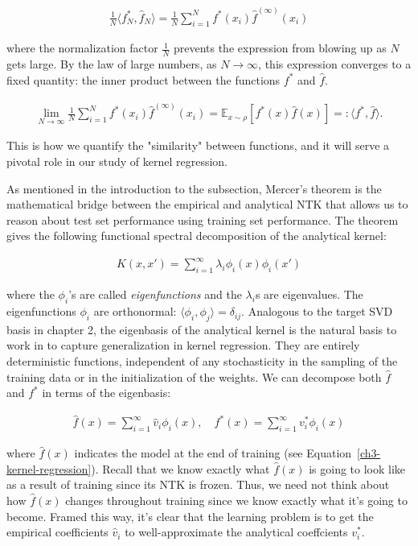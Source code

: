 \begin{align}
\frac{1}{N}\langle f^*_N,\hat{f}_N \rangle = \frac{1}{N}\sum^N_{i=1}{f^*}(x_i){\hat{f}}^{(\infty)}(x_i)
\end{align}

where the normalization factor $\frac{1}{N}$ prevents the expression from blowing up as $N$ gets large. By the law of large numbers, as $N\to\infty$, this expression converges to a fixed quantity: the inner product between the functions $f^*$ and $\hat{f}$.

\begin{align}
\lim_{N\to\infty} \frac{1}{N}\sum^N_{i=1}{f^*}(x_i){\hat{f}}^{(\infty)}(x_i) = \mathbb{E}_{x\sim \rho} [f^*(x)\hat{f}(x)] =: \langle f^*, \hat{f} \rangle.
\end{align}

This is how we quantify the "similarity" between functions, and it will serve a pivotal role in our study of kernel regression.

As mentioned in the introduction to the subsection, Mercer's theorem is the mathematical bridge between the empirical and analytical NTK that allows us to reason about test set performance using training set performance. The theorem gives the following functional spectral decomposition of the analytical kernel:

\begin{align}
K(x,x') = \sum^{\infty}_{i=1} \lambda_i \phi_i(x) \phi_i(x')
\end{align}

where the $\phi_i$'s are called \textit{eigenfunctions} and the $\lambda_i$s are eigenvalues. The eigenfunctions $\phi_i$ are orthonormal: $\langle \phi_i,\phi_j \rangle=\delta_{ij}$.
Analogous to the target SVD basis in chapter 2, the eigenbasis of the analytical kernel is the natural basis to work in to capture generalization in kernel regression. They are entirely deterministic functions, independent of any stochasticity in the sampling of the training data or in the initialization of the weights. We can decompose both $\hat{f}$ and $f^*$ in terms of the eigenbasis:

\begin{align}
\hat{f}(x)=\sum^\infty_{i=1} \hat{v}_i \phi_i(x), \quad {f}^*(x)=\sum^\infty_{i=1} {v}^*_i \phi_i(x)
\end{align}

where $\hat{f}(x)$ indicates the model at the end of training (see Equation~\eqref{ch3-kernel-regression}). Recall that we know exactly what $\hat{f}(x)$ is going to look like as a result of training since its NTK is frozen. Thus, we need not think about how $\hat{f}(x)$ changes throughout training since we know exactly what it's going to become. Framed this way, it's clear that the learning problem is to get the empirical coefficients $\hat{v}_i$ to well-approximate the analytical coeffcients ${v}^*_i$. 

